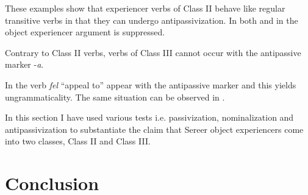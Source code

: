 \documentclass[output=paper]{langscibook}
\begin{document}
These examples show that experiencer verbs of Class II behave like regular transitive verbs in that they can undergo antipassivization. In both  and in  the object experiencer argument is suppressed.

Contrary to Class II verbs, verbs of Class III cannot occur with the antipassive marker -\textit{a}.

\ea \label{ex:tamba:22}
 \label{ex:tamba:22b}
\z
\z
      
In  the verb  \textit{fel} “appeal to”  appear with the antipassive marker and this yields ungrammaticality. The same situation can be observed in .

\ea \label{ex:tamba:23}
 \label{ex:tamba:23a}
\label{ex:tamba:23b}
\z
\z
              
In this section I have used various tests i.e. passivization, nominalization and antipassivization to substantiate the claim that Sereer object experiencers come into two classes, Class II and Class III. 

\section{Conclusion}
\end{document}
